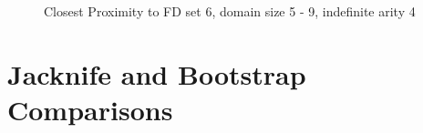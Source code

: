 \begin{figure}
\begin{minipage}{7cm}
\centerline{}
\caption{\label{graph:6.1} {Closest Proximity to FD set 15, varying
domain sizes 5 - 9, chase and naive approaches, indefinite arity 4}}
\end{minipage}
\hfill
\begin{minipage}{7cm}
\centerline{}
\caption{\label{graph:5.15} {Closest Proximity to FD set 6, domain
size 5 - 9, indefinite arity 4}}
\end{minipage}
\end{figure}


\section{Jacknife and Bootstrap Comparisons}

